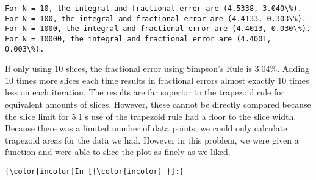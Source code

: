 \documentclass[11pt]{article}
\begin{document}
    \begin{Verbatim}[commandchars=\\\{\}]
For N = 10, the integral and fractional error are (4.5338, 3.040\%).
For N = 100, the integral and fractional error are (4.4133, 0.303\%).
For N = 1000, the integral and fractional error are (4.4013, 0.030\%).
For N = 10000, the integral and fractional error are (4.4001, 0.003\%).

    \end{Verbatim}

    If only using 10 slices, the fractional error using Simpson's Rule is
3.04\%. Adding 10 times more slices each time results in fractional
errors almost exactly 10 times less on each iteration. The results are
far superior to the trapezoid rule for equivalent amounts of slices.
However, these cannot be directly compared because the slice limit for
5.1's use of the trapezoid rule had a floor to the slice width. Because
there was a limited number of data points, we could only calculate
trapezoid areas for the data we had. However in this problem, we were
given a function and were able to slice the plot as finely as we liked.

    \begin{Verbatim}[commandchars=\\\{\}]
{\color{incolor}In [{\color{incolor} }]:} 
\end{Verbatim}


    
    
    
    
\end{document}
